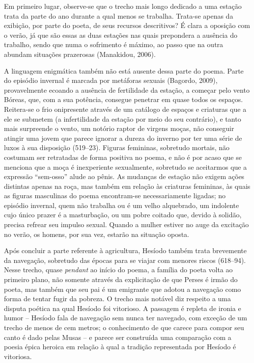 Em primeiro lugar, observe-se que o trecho mais longo dedicado a uma
estação trata da parte do ano durante a qual menos se trabalha.
Trata-se apenas da exibição, por parte do poeta, de seus recursos
descritivos? É clara a oposição com o verão, já que são essas as duas
estações nas quais prepondera a ausência do trabalho, sendo que numa 
o sofrimento é máximo, ao passo que na outra abundam situações prazerosas 
(Manakidou, 2006).

A linguagem enigmática também não está ausente dessa parte do poema.
Parte do episódio invernal é marcada por metáforas sexuais (Bagordo, 2009), 
provavelmente ecoando a ausência  de fertilidade da estação,
a começar pelo vento Bóreas, que, com a sua potência, consegue penetrar
em quase todos os espaços. Reitera-se o frio onipresente através de um
catálogo de espaços e criaturas que a ele se submetem (a infertilidade
da estação por meio do seu contrário), e tanto mais surpreende o
vento, um notório raptor de virgens moças, não conseguir atingir uma
jovem que parece ignorar a dureza do inverno por ter uma série de
luxos à sua disposição (519--23). Figuras femininas, sobretudo mortais,
não costumam ser retratadas de forma positiva no poema, e não é por
acaso que se menciona que a moça é inexperiente sexualmente, sobretudo
se aceitarmos que a expressão “sem-osso” alude ao pênis. As mudanças de
estação não exigem ações distintas apenas na roça, mas também em
relação às criaturas femininas, às quais as figuras masculinas do poema
encontram-se necessariamente ligadas; no episódio invernal, quem não
trabalha ou é um velho alquebrado, um indolente cujo único prazer é a
masturbação, ou um pobre coitado que, devido à solidão, precisa refrear
seu impulso sexual. Quando a mulher estiver no auge da excitação no
verão, os homens, por sua vez, estarão na situação oposta.

Após concluir a parte referente à agricultura, Hesíodo também trata
brevemente da navegação, sobretudo das épocas para se viajar com
menores riscos (618--94). Nesse trecho, quase \textit{pendant}
ao início do poema, a família do poeta volta ao primeiro plano, não
somente através da explicitação de que Perses é irmão do poeta, mas
também que seu pai é um emigrante que adotou a navegação como forma de
tentar fugir da pobreza. O trecho mais notável diz respeito a
uma disputa poética na qual Hesíodo foi vitorioso. A passagem é repleta
de ironia e humor – Hesíodo fala de navegação sem nunca ter navegado,
com exceção de um trecho de menos de cem metros; o conhecimento de que carece
para compor seu canto é dado pelas Musas – e parece ser construída uma
comparação com a poesia épica heroica em relação à qual a tradição
representada por Hesíodo é vitoriosa.

